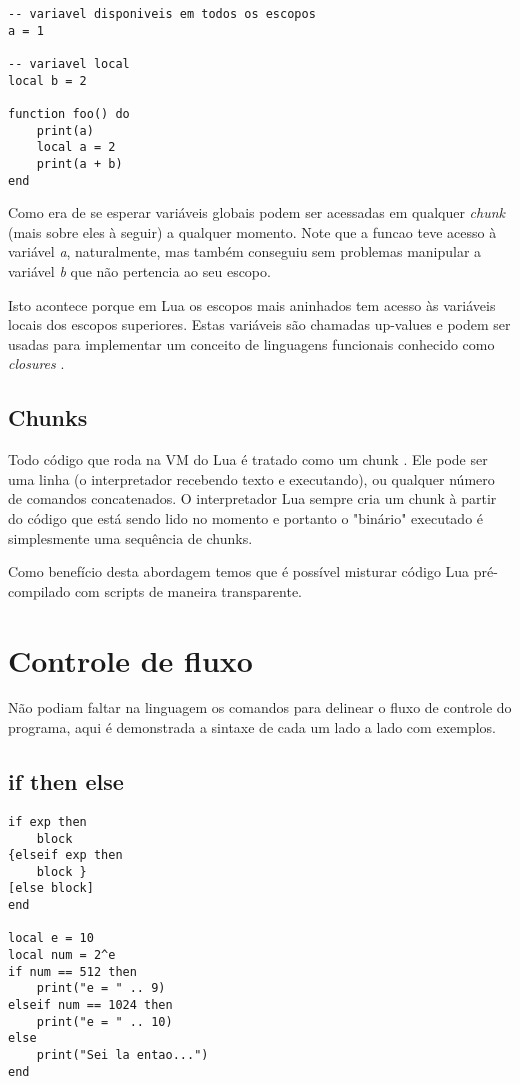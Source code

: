 \documentclass[a4paper,12pt]{abnt}
\begin{document}
\begin{lstlisting}
-- variavel disponiveis em todos os escopos
a = 1

-- variavel local
local b = 2

function foo() do
    print(a)
    local a = 2
    print(a + b)
end
\end{lstlisting}

Como era de se esperar variáveis globais podem ser acessadas em qualquer
\emph{chunk} (mais sobre eles à seguir) a qualquer momento.
Note que a funcao teve acesso à variável \emph{a}, naturalmente,
mas também conseguiu sem problemas manipular
a variável \emph{b} que não pertencia ao seu escopo.

Isto acontece porque em Lua os escopos mais aninhados tem acesso às
variáveis locais dos escopos superiores.
Estas variáveis são chamadas up-values e podem ser usadas para
implementar um conceito de linguagens
funcionais conhecido como \emph{closures} \cite{closures}.

\section{Chunks}

Todo código que roda na VM do Lua é tratado como um chunk \cite{pil}.
Ele pode ser uma linha (o interpretador recebendo texto e executando),
ou qualquer número de comandos concatenados. O interpretador Lua sempre
cria um chunk à partir do código que está sendo lido no momento e
portanto o "binário" executado é simplesmente uma sequência de chunks.

Como benefício desta abordagem temos que é possível misturar código Lua
pré-compilado com scripts de maneira transparente.

\chapter{Controle de fluxo}

Não podiam faltar na linguagem os comandos para delinear o
fluxo de controle do programa, aqui é demonstrada a
sintaxe de cada um lado a lado com exemplos.


\section{if then else}

\begin{lstlisting}
if exp then
	block
{elseif exp then
	block }
[else block]
end

local e = 10
local num = 2^e
if num == 512 then
	print("e = " .. 9)
elseif num == 1024 then
	print("e = " .. 10)
else
	print("Sei la entao...")
end
\end{lstlisting}
\end{document}
